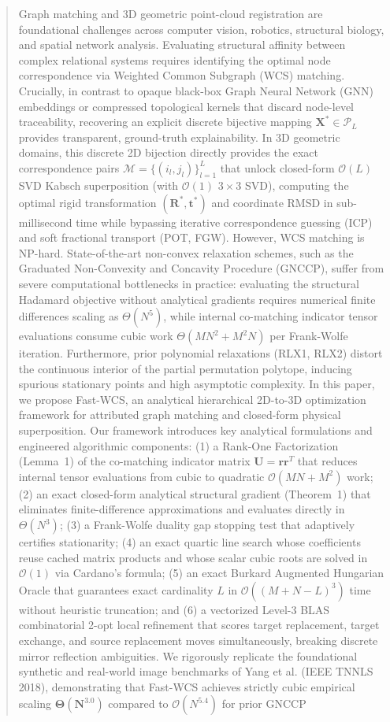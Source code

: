 \documentclass[conference]{IEEEtran}
\begin{document}
\begin{abstract}
Graph matching and 3D geometric point-cloud registration are foundational challenges across computer vision, robotics, structural biology, and spatial network analysis. Evaluating structural affinity between complex relational systems requires identifying the optimal node correspondence via Weighted Common Subgraph (WCS) matching. Crucially, in contrast to opaque black-box Graph Neural Network (GNN) embeddings or compressed topological kernels that discard node-level traceability, recovering an explicit discrete bijective mapping $\mathbf{X}^* \in \mathcal{P}_L$ provides transparent, ground-truth explainability. In 3D geometric domains, this discrete 2D bijection directly provides the exact correspondence pairs $\mathcal{M} = \{(i_l, j_l)\}_{l=1}^L$ that unlock closed-form $\mathcal{O}(L)$ SVD Kabsch superposition (with $\mathcal{O}(1)$ $3 \times 3$ SVD), computing the optimal rigid transformation $(\mathbf{R}^*, \mathbf{t}^*)$ and coordinate RMSD in sub-millisecond time while bypassing iterative correspondence guessing (ICP) and soft fractional transport (POT, FGW). However, WCS matching is NP-hard. State-of-the-art non-convex relaxation schemes, such as the Graduated Non-Convexity and Concavity Procedure (GNCCP), suffer from severe computational bottlenecks in practice: evaluating the structural Hadamard objective without analytical gradients requires numerical finite differences scaling as $\Theta(N^5)$, while internal co-matching indicator tensor evaluations consume cubic work $\Theta(MN^2 + M^2N)$ per Frank-Wolfe iteration. Furthermore, prior polynomial relaxations (RLX1, RLX2) distort the continuous interior of the partial permutation polytope, inducing spurious stationary points and high asymptotic complexity. In this paper, we propose Fast-WCS, an analytical hierarchical 2D-to-3D optimization framework for attributed graph matching and closed-form physical superposition. Our framework introduces key analytical formulations and engineered algorithmic components: (1) a Rank-One Factorization (Lemma~1) of the co-matching indicator matrix $\mathbf{U} = \mathbf{r}\mathbf{r}^T$ that reduces internal tensor evaluations from cubic to quadratic $\mathcal{O}(MN + M^2)$ work; (2) an exact closed-form analytical structural gradient (Theorem~1) that eliminates finite-difference approximations and evaluates directly in $\Theta(N^3)$; (3) a Frank-Wolfe duality gap stopping test that adaptively certifies stationarity; (4) an exact quartic line search whose coefficients reuse cached matrix products and whose scalar cubic roots are solved in $\mathcal{O}(1)$ via Cardano's formula; (5) an exact Burkard Augmented Hungarian Oracle that guarantees exact cardinality $L$ in $\mathcal{O}((M+N-L)^3)$ time without heuristic truncation; and (6) a vectorized Level-3 BLAS combinatorial 2-opt local refinement that scores target replacement, target exchange, and source replacement moves simultaneously, breaking discrete mirror reflection ambiguities. We rigorously replicate the foundational synthetic and real-world image benchmarks of Yang et al. (IEEE TNNLS 2018), demonstrating that Fast-WCS achieves strictly cubic empirical scaling $\mathbf{\Theta(N^{3.0})}$ compared to $\mathcal{O}(N^{5.4})$ for prior GNCCP 
\end{abstract}
\end{document}
